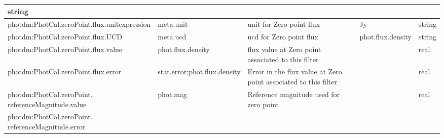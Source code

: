 \documentclass[11pt,a4paper]{ivoa}
\begin{document}
\begin{appendices}
\begin{table}[H]
\begin{adjustbox}{angle=90}
\begin{tabular}{p{2.5in}|p{1.5in}|p{2in}|p{0.74in}|p{0.35in}}
\multicolumn{1}{p{0.35in}}{{\fontsize{8pt}{8pt}\selectfont string}} \\
\hline
\multicolumn{1}{p{2.5in}}{{\fontsize{8pt}{8pt}
\selectfont photdm:PhotCal.zeroPoint.\-flux.unitexpression}} &
\multicolumn{1}{p{1.5in}}{{\fontsize{8pt}{8pt}\selectfont meta.unit }} &
\multicolumn{1}{p{2in}}{{\fontsize{8pt}{8pt}\selectfont unit for Zero point flux}} &
\multicolumn{1}{p{0.74in}}{{\fontsize{8pt}{8pt}\selectfont Jy}} &
\multicolumn{1}{p{0.35in}}{{\fontsize{8pt}{8pt}\selectfont string}} \\
\hline
\multicolumn{1}{p{2.5in}}{{\fontsize{8pt}{8pt}\selectfont photdm:PhotCal.zeroPoint.\-flux.UCD}} &
\multicolumn{1}{p{1.5in}}{{\fontsize{8pt}{8pt}\selectfont meta.ucd }} &
\multicolumn{1}{p{2in}}{{\fontsize{8pt}{8pt}\selectfont ucd for Zero point flux}} &
\multicolumn{1}{p{0.74in}}{{\fontsize{8pt}{8pt}\selectfont phot.flux.density}} &
\multicolumn{1}{p{0.35in}}{{\fontsize{8pt}{8pt}\selectfont string}} \\
\hline
\multicolumn{1}{p{2.5in}}{{\fontsize{8pt}{8pt}\selectfont photdm:PhotCal.zeroPoint.\-flux.value}} &
\multicolumn{1}{p{1.5in}}{{\fontsize{8pt}{8pt}\selectfont phot.flux.density }} &
\multicolumn{1}{p{2in}}{{\fontsize{8pt}{8pt}\selectfont flux value at Zero point associated
to this filter}} &
\multicolumn{1}{p{0.74in}}{} &
\multicolumn{1}{p{0.35in}}{{\fontsize{8pt}{8pt}\selectfont real}} \\
\hline
\multicolumn{1}{p{2.5in}}{{\fontsize{8pt}{8pt}\selectfont photdm:PhotCal.zeroPoint.\-flux.error}} &
\multicolumn{1}{p{1.5in}}{{\fontsize{8pt}{8pt}\selectfont stat.error;phot.flux.density}} &
\multicolumn{1}{p{2in}}{{\fontsize{8pt}{8pt}\selectfont Error in the flux value at Zero point
associated to this filter}} &
\multicolumn{1}{p{0.74in}}{} &
\multicolumn{1}{p{0.35in}}{{\fontsize{8pt}{8pt}\selectfont real}} \\
\hline
\multicolumn{1}{p{2.5in}}{{\fontsize{8pt}{8pt}
\selectfont photdm:PhotCal.zeroPoint.\newline referenceMagnitude.value}} &
\multicolumn{1}{p{1.5in}}{{\fontsize{8pt}{8pt}\selectfont phot.mag}} &
\multicolumn{1}{p{2in}}{{\fontsize{8pt}{8pt}\selectfont Reference magnitude used for zero point}} &
\multicolumn{1}{p{0.74in}}{{\fontsize{8pt}{8pt}\selectfont 0.0}} &
\multicolumn{1}{p{0.35in}}{{\fontsize{8pt}{8pt}\selectfont real} \par } \\
\hline
\multicolumn{1}{p{2.5in}}{{\fontsize{8pt}{8pt}
\selectfont photdm:PhotCal.zeroPoint.\newline referenceMagnitude.error}} &

\end{tabular}
\end{adjustbox}
\end{table}
\end{appendices}
\end{document}
